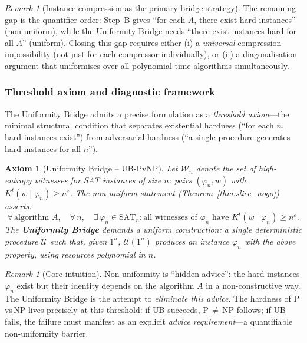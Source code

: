 \documentclass[aps,prd,twocolumn,superscriptaddress,nofootinbib]{revtex4-2}
\newtheorem{axiom}[theorem]{Axiom}
\theoremstyle{definition}
\theoremstyle{remark}
\newtheorem{remark}[theorem]{Remark}
\begin{document}
\begin{remark}[Instance compression as the primary bridge strategy]
The remaining gap is the quantifier order: Step~B gives ``for each $A$, there exist hard instances'' (non-uniform), while the Uniformity Bridge needs ``there exist instances hard for all $A$'' (uniform). Closing this gap requires either (i) a \emph{universal} compression impossibility (not just for each compressor individually), or (ii) a diagonalisation argument that uniformises over all polynomial-time algorithms simultaneously.
\end{remark}

\subsubsection*{Threshold axiom and diagnostic framework}

The Uniformity Bridge admits a precise formulation as a \emph{threshold axiom}---the minimal structural condition that separates existential hardness (``for each $n$, hard instances exist'') from adversarial hardness (``a single procedure generates hard instances for all $n$'').

\begin{axiom}[Uniformity Bridge -- UB-PvNP]\label{ax:ub-pvnp}
Let $\mathcal{W}_n$ denote the set of high-entropy witnesses for SAT instances of size $n$: pairs $(\varphi_n, w)$ with $K^t(w \mid \varphi_n) \geq n^\varepsilon$. The \emph{non-uniform} statement (Theorem~\ref{thm:slice_nogo}) asserts:
\[
  \forall\, \text{algorithm } A,\quad \forall\, n,\quad \exists\, \varphi_n \in \mathrm{SAT}_n : \text{all witnesses of } \varphi_n \text{ have } K^t(w \mid \varphi_n) \geq n^\varepsilon.
\]
The \textbf{Uniformity Bridge} demands a \emph{uniform} construction: a single deterministic procedure $\mathcal{U}$ such that, given $1^n$, $\mathcal{U}(1^n)$ produces an instance $\varphi_n$ with the above property, using resources polynomial in $n$.
\end{axiom}

\begin{remark}[Core intuition]\label{rem:ub-intuition}
Non-uniformity is ``hidden advice'': the hard instances $\varphi_n$ exist but their identity depends on the algorithm $A$ in a non-constructive way. The Uniformity Bridge is the attempt to \emph{eliminate this advice}. The hardness of P\,vs\,NP lives precisely at this threshold: if UB succeeds, P$\,\neq\,$NP follows; if UB fails, the failure must manifest as an explicit \emph{advice requirement}---a quantifiable non-uniformity barrier.
\end{remark}
\end{document}
